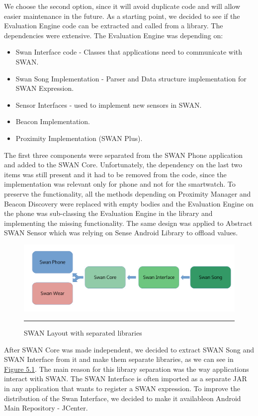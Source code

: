 We choose the second option, since it will avoid duplicate code and will allow easier maintenance in the future. As a starting point, we decided to see if the Evaluation Engine
code can be extracted and called from a library. The dependencies were extensive. The Evaluation Engine was depending on:
\begin{itemize}
 \item Swan Interface code - Classes that applications need to communicate with SWAN.
 \item Swan Song Implementation - Parser and Data structure implementation for SWAN Expression.
 \item Sensor Interfaces - used to implement new sensors in SWAN.
 \item Beacon Implementation.
 \item Proximity Implementation (SWAN Plus).
\end{itemize}

The first three components were separated from the SWAN Phone application and added to the SWAN Core. Unfortunately, the dependency on the last two items
was still present and it had to be removed from the code, since the implementation was relevant only for phone and not for the smartwatch.
To preserve the functionality, all the methods depending on Proximity Manager and Beacon Discovery were replaced with empty bodies and the Evaluation Engine on
the phone was sub-classing the Evaluation Engine in the library and implementing the missing functionality.
The same design was applied to Abstract SWAN Sensor which was relying on Sense Android Library to offload values\cite{swan_layer}.

\begin{figure}[htbp]
  \centering
    \includegraphics[scale=0.5]{Figures/swan_layout.pdf}
    \rule{35em}{0.5pt}
  \caption[SWAN Layout with separated libraries]{SWAN Layout with separated libraries}
  \label{fig:swan_layout}
\end{figure}

After SWAN Core was made independent, we decided to extract SWAN Song and SWAN Interface from it and make them separate libraries, as we can see in \hyperref[fig:swan_layout]{Figure 5.1}.
The main reason for this library separation was the way applications interact with SWAN. The SWAN Interface is often imported as a separate JAR in any application that wants to register a 
SWAN expression. To improve the distribution of the Swan Interface, we decided to make it available\footnotemark  on Android Main Repository - JCenter\cite{jcenter}. 

